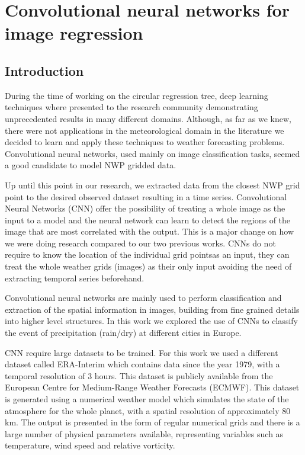 
\section{Convolutional neural networks for image regression}

\subsection{Introduction}
During the time of working on the circular regression tree, deep learning techniques where presented to the research community demonstrating unprecedented results in many different domains. Although, as far as we knew, there were not applications in the meteorological domain in the literature we decided to learn and apply these techniques to weather forecasting problems. Convolutional neural networks, used mainly on image classification tasks, seemed a good candidate to model NWP gridded data.

Up until this point in our research, we extracted data from the closest NWP grid point to the desired observed dataset resulting in a time series. Convolutional Neural Networks (CNN) offer the possibility of treating a whole image as the input to a model and the neural network can learn to detect the regions of the image that are most correlated with the output. This is a major change on how we were doing research compared to our two previous works. CNNs do not require to know the location of the individual grid pointsas an input, they can treat the whole weather grids (images) as their only input avoiding the need of extracting temporal series beforehand.

Convolutional neural networks are mainly used to perform classification and extraction of the spatial information in images, building from fine grained details into higher level structures. In this work we explored the use of CNNs to classify the event of precipitation (rain/dry) at different cities in Europe. 

CNN require large datasets to be trained. For this work we used a different dataset called ERA-Interim \cite{dee2011era} which contains data since the year 1979, with a temporal resolution of 3 hours. This dataset is publicly available from the European Centre for Medium-Range Weather Forecasts (ECMWF). This dataset is generated using a numerical weather model which simulates the state of the atmosphere for the whole planet, with a spatial resolution of approximately 80 km.  The output is presented in the form of regular numerical grids and there is a large number of physical parameters available, representing variables such as temperature, wind speed and relative vorticity.

